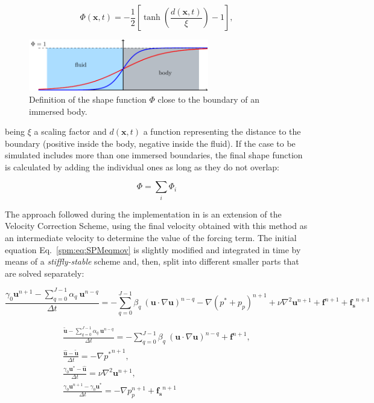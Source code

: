 \begin{equation} 
    \Phi(\mathbf{x},t) = -\frac{1}{2} \left[ \tanh\left(\frac{d(\mathbf{x},t)}
        {\xi}\right)-1 \right],
\label{spm:eq:mask}
\end{equation}

\begin{figure}[!htbp]
    \centering
    \includegraphics[width=0.7\textwidth]{img/concentration.pdf}
    \caption{Definition of the shape function $\Phi$ close to the boundary of
        an immersed body.}
    \label{spm:fig:shapefunc}
\end{figure}

being $\xi$ a scaling factor \cite{WangSPM} and $d(\mathbf{x}, t)$ a function
representing the distance to the boundary (positive inside the body, negative
inside the fluid). If the case to be simulated includes more than one immersed
boundaries, the final shape function is calculated by adding the individual
ones as long as they do not overlap:

\begin{equation}
    \Phi = \sum_i \Phi_i
\end{equation}

The approach followed during the implementation in \nekpp is an extension of
the Velocity Correction Scheme, using the final velocity obtained with this
method as an intermediate velocity to determine the value of the forcing term.
The initial equation Eq.~\eqref{spm:eq:SPMeqmov} is slightly modified and
integrated in time by means of a \emph{stiffly-stable} scheme and, then,
split into different smaller parts that are solved separately:

\begin{equation}
     \frac{\gamma_0\mathbf{u}^{n+1}-\sum_{q=0}^{J-1}\alpha_q~\mathbf{u}^{n-q}}
        {\Delta t} = -\sum_{q=0}^{J-1}\beta_q~(\mathbf{u}\cdot
        \nabla\mathbf{u})^{n-q} -\nabla (p^*+p_p)^{n+1} +
        \nu\nabla^2\mathbf{u}^{n+1} + \mathbf{f}^{n+1} + \mathbf{f_s}^{n+1}
\end{equation}

\begin{subequations}
\begin{gather}
    \frac{\mathbf{\tilde{u}}-\sum_{q=0}^{J-1}\alpha_q~\mathbf{u}^{n-q}}
        {\Delta t} = -\sum_{q=0}^{J-1}\beta_q~(\mathbf{u}\cdot
        \nabla\mathbf{u})^{n-q} + \mathbf{f}^{n+1},\\
    \frac{\mathbf{\hat{u}}-\mathbf{\tilde{u}}}{\Delta t} =
        -\nabla {p^*}^{n+1},\\[3mm]
    \frac{\gamma_0\mathbf{u^*}-\mathbf{\hat{u}}}{\Delta t} =
        \nu\nabla^2\mathbf{u}^{n+1},\\[3mm]
    \frac{\gamma_0\mathbf{u}^{n+1}-\gamma_0\mathbf{u^*}}{\Delta t} =
        -\nabla p_p^{n+1} + \mathbf{f_s}^{n+1}
\end{gather}
\end{subequations}

